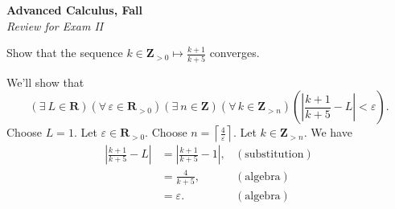 \documentclass[12pt,fleqn,answers]{exam}
\newcommand{\reals}{\mathbf{R}}
\newcommand{\integers}{\mathbf{Z}}
\let\oldforall\forall
\renewcommand{\forall}{\oldforall \, }
\let\oldexist\exists
\renewcommand{\exists}{\oldexist \: }
\begin{document}
\large
\begin{flushleft}
  \textbf{Advanced Calculus, Fall \the\year}\\
  \emph{Review for Exam II}
\end{flushleft}

\begin{questions}

\question Show that the sequence $k \in \integers_{>0} \mapsto \frac{k+1}{k+5}$ converges.
\begin{solution} We'll show that
\begin{equation*}
  (\exists L \in \reals)
  (\forall \varepsilon \in \reals_{>0})
  (\exists n \in \integers) 
  \left(\forall k \in \integers_{>n}\right )
  \left (\left |  \frac{k+1}{k+5} - L \right | < \varepsilon \right).
\end{equation*}
Choose $L=1$.  Let $\varepsilon \in \reals_{>0}$.  Choose 
$n = \left \lceil \frac{4}{\varepsilon} \right \rceil$.  Let $k \in \integers_{>n}$. We have
\begin{align*}
\left|  \frac{k+1}{k+5} - L \right | &=  \left | \frac{k+1}{k+5} - 1 \right |, & (\mbox{substitution}) \\
                                        &=   \frac{4}{k+5},            &(\mbox{algebra}) \\
                                        &= \varepsilon.  &(\mbox{algebra})
\end{align*}

\end{solution}

\end{questions}
\end{document}
